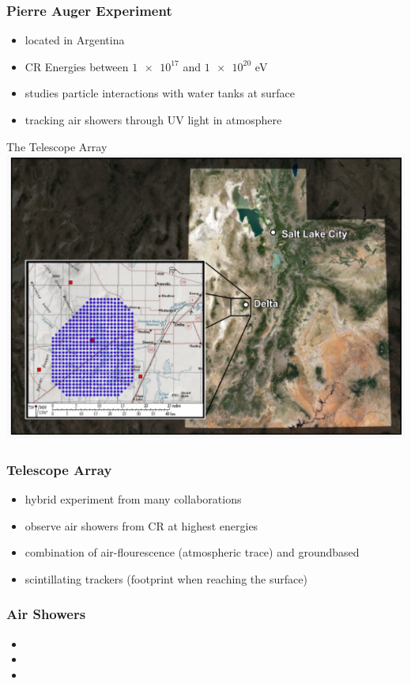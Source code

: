 \documentclass[aspectratio=1610, 9pt]{beamer}
\begin{document}
\begin{frame}\frametitle{Pierre Auger Experiment}
  \begin{itemize}
    \item located in Argentina
    \item CR Energies between $\num{1e17}$ and $\num{1e20}$ eV
    \item studies particle interactions with water tanks at surface
    \item tracking air showers through UV light in atmosphere
  \end{itemize}
\end{frame}

\begin{frame}{The Telescope Array}
  \includegraphics[width=\textwidth]{TCA.png}
\end{frame}

\begin{frame}\frametitle{Telescope Array}
  \begin{itemize}
    \item hybrid experiment from many collaborations
    \item observe air showers from CR at highest energies
    \item combination of air-flourescence (atmospheric trace) and groundbased
    \item scintillating trackers (footprint when reaching the surface)
  \end{itemize}
\end{frame}

\begin{frame}\frametitle{Air Showers}
  \begin{itemize}
    \item
    \item
    \item
  \end{itemize}
\end{frame}
\end{document}
